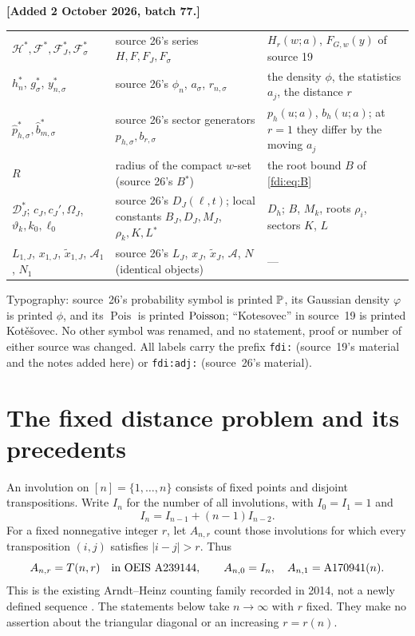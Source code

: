 \documentclass[11pt,letterpaper]{article}
\theoremstyle{remark}\newtheorem{remark}[theorem]{Remark}
\newenvironment{mergenote}[1][2 October 2026, batch 77]{\par\smallskip\begingroup\small\noindent\textbf{[Added #1.]}\ }{\endgroup\par\smallskip}
\begin{document}
\begin{mergenote}
\begin{center}
\begin{tabular}{@{}>{\raggedright\arraybackslash}p{2.6cm}>{\raggedright\arraybackslash}p{5.6cm}>{\raggedright\arraybackslash}p{6.0cm}@{}}
$\mathcal H^\ast,\mathcal F^\ast,\mathcal F_J^\ast,\mathcal F_\sigma^\ast$&source 26's series $H,F,F_J,F_\sigma$&$H_r(w;a)$, $F_{G,w}(y)$ of source 19\\
$h_n^\ast$, $g_\sigma^\ast$, $y_{n,\sigma}^\ast$&source 26's $\phi_n$, $a_\sigma$, $r_{n,\sigma}$&the density $\phi$, the statistics $a_j$, the distance $r$\\
$\widehat p_{h,\sigma}^\ast,\widehat b_{m,\sigma}^\ast$&source 26's sector generators $p_{h,\sigma},b_{r,\sigma}$&$p_h(u;a)$, $b_h(u;a)$; at $r=1$ they differ by the moving $a_j$\\
$R$&radius of the compact $w$-set (source 26's $B$$^\ast$)&the root bound $B$ of \eqref{fdi:eq:B}\\
$\mathcal D_J^\ast$; $c_J,c_J',\Omega_J$, $\vartheta_k,k_0,\ell_0$&source 26's $D_J(\ell,t)$; local constants $B_J,D_J,M_J$, $\rho_k,K,L$$^\ast$&$D_h$; $B$, $M_k$, roots $\rho_i$, sectors $K$, $L$\\
$L_{1,J}$, $x_{1,J}$, $\widetilde x_{1,J}$, $\mathcal A_1$, $N_1$&source 26's $L_J$, $x_J$, $\widetilde x_J$, $\mathcal A$, $N$ (identical objects)&---\\
\bottomrule
\end{tabular}
\end{center}
Typography: source~26's probability symbol is printed $\mathbb P$, its Gaussian density $\varphi$ is printed $\phi$, and its $\operatorname{Pois}$ is printed $\operatorname{Poisson}$; ``Kotesovec'' in source~19 is printed Kot\v{e}\v{s}ovec. No other symbol was renamed, and no statement, proof or number of either source was changed. All labels carry the prefix \texttt{fdi:} (source~19's material and the notes added here) or \texttt{fdi:adj:} (source~26's material).
\end{mergenote}

\section{The fixed distance problem and its precedents}
An involution on $[n]=\{1,\ldots,n\}$ consists of fixed points and disjoint transpositions. Write $I_n$ for the number of all involutions, with $I_0=I_1=1$ and
\begin{equation}\label{fdi:eq:Irec}
 I_n=I_{n-1}+(n-1)I_{n-2}.
\end{equation}
For a fixed nonnegative integer $r$, let $A_{n,r}$ count those involutions for which every transposition $(i,j)$ satisfies $|i-j|>r$. Thus
\[
 A_{n,r}=T(n,r)\quad\hbox{in OEIS A239144},\qquad
 A_{n,0}=I_n,\quad A_{n,1}=\mathrm{A170941}(n).
\]
This is the existing Arndt--Heinz counting family recorded in 2014, not a newly defined sequence \cite{oeis239144}. The statements below take $n\to\infty$ with $r$ fixed. They make no assertion about the triangular diagonal or an increasing $r=r(n)$.
\end{document}
